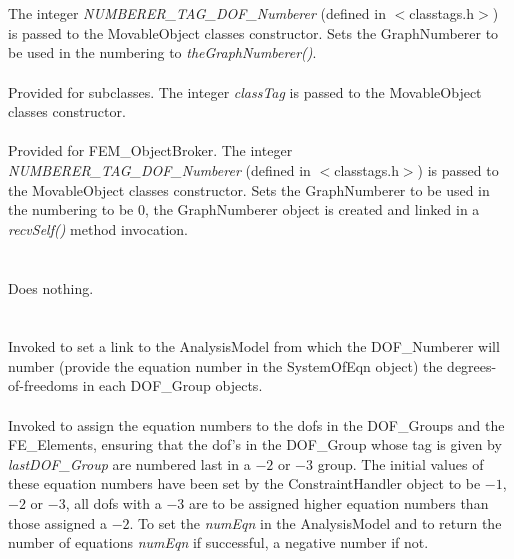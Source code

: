  \\
\\ 
The integer {\em NUMBERER\_TAG\_DOF\_Numberer}
(defined in $<$classtags.h$>$) is passed to the MovableObject classes
constructor. Sets the GraphNumberer to be used in the numbering to {\em
theGraphNumberer()}. \\

\\ 
Provided for subclasses. The integer {\em classTag} is passed to the
MovableObject classes constructor. \\


\\ 
Provided for FEM\_ObjectBroker. The integer {\em NUMBERER\_TAG\_DOF\_Numberer}
(defined in $<$classtags.h$>$) is passed to the MovableObject classes
constructor. Sets the GraphNumberer to be used in the numbering to be
$0$, the GraphNumberer object is created and linked in a {\em
recvSelf()} method invocation. \\


 \\
\\ 
Does nothing. \\

\\
 \\
Invoked to set a link to the AnalysisModel from which the
DOF\_Numberer will number (provide the equation number in the
SystemOfEqn object) the degrees-of-freedoms in each DOF\_Group
objects.\\  

 \\
Invoked to assign the equation numbers to the dofs in the DOF\_Groups
and the FE\_Elements, ensuring that the dof's in the DOF\_Group whose
tag is given by {\em lastDOF\_Group} are numbered last in a $-2$ or
$-3$ group. The initial values of these equation numbers have been set
by the ConstraintHandler object to be $-1$, $-2$ or $-3$, all dofs
with a $-3$ are to be assigned higher equation numbers than those
assigned a $-2$. To set the {\em numEqn} in the AnalysisModel and to
return the number of equations {\em numEqn} if successful, a negative
number if not.  

